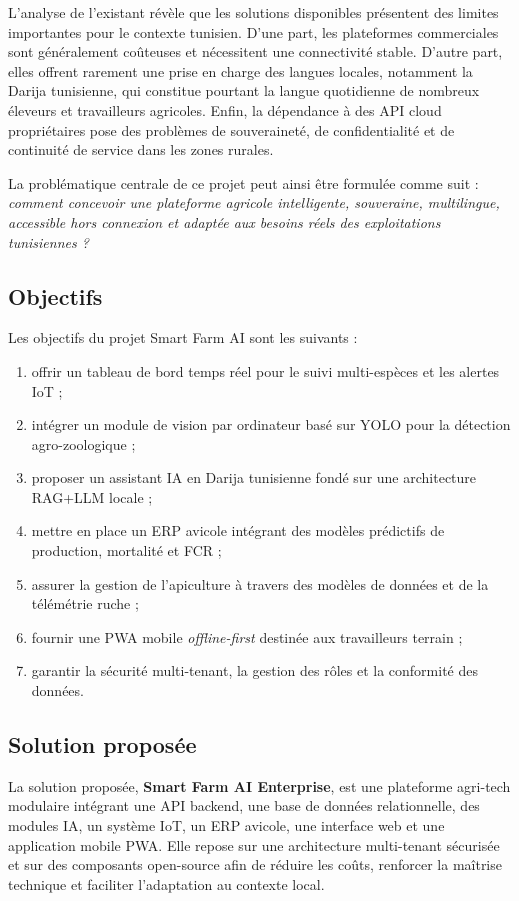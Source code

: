 L'analyse de l'existant révèle que les solutions disponibles présentent des
limites importantes pour le contexte tunisien. D'une part, les plateformes
commerciales sont généralement coûteuses et nécessitent une connectivité stable.
D'autre part, elles offrent rarement une prise en charge des langues locales,
notamment la Darija tunisienne, qui constitue pourtant la langue quotidienne de
nombreux éleveurs et travailleurs agricoles. Enfin, la dépendance à des API
cloud propriétaires pose des problèmes de souveraineté, de confidentialité et de
continuité de service dans les zones rurales.

La problématique centrale de ce projet peut ainsi être formulée comme suit :
\textit{comment concevoir une plateforme agricole intelligente, souveraine,
multilingue, accessible hors connexion et adaptée aux besoins réels des
exploitations tunisiennes ?}

\subsection{Objectifs}

Les objectifs du projet Smart Farm AI sont les suivants :
\begin{enumerate}
  \item offrir un tableau de bord temps réel pour le suivi multi-espèces et les alertes IoT ;
  \item intégrer un module de vision par ordinateur basé sur YOLO pour la détection agro-zoologique ;
  \item proposer un assistant IA en Darija tunisienne fondé sur une architecture RAG+LLM locale ;
  \item mettre en place un ERP avicole intégrant des modèles prédictifs de production, mortalité et FCR ;
  \item assurer la gestion de l'apiculture à travers des modèles de données et de la télémétrie ruche ;
  \item fournir une PWA mobile \textit{offline-first} destinée aux travailleurs terrain ;
  \item garantir la sécurité multi-tenant, la gestion des rôles et la conformité des données.
\end{enumerate}

\subsection{Solution proposée}

La solution proposée, \textbf{Smart Farm AI Enterprise}, est une plateforme
agri-tech modulaire intégrant une API backend, une base de données relationnelle,
des modules IA, un système IoT, un ERP avicole, une interface web et une
application mobile PWA. Elle repose sur une architecture multi-tenant sécurisée
et sur des composants open-source afin de réduire les coûts, renforcer la
maîtrise technique et faciliter l'adaptation au contexte local.

